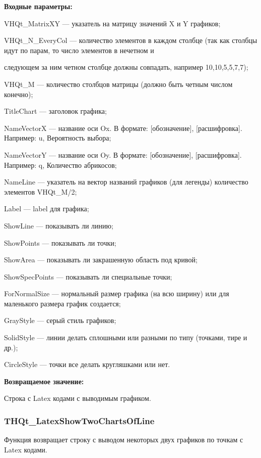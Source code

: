 \documentclass[a4paper,12pt]{article}
\begin{document}
\textbf{Входные параметры:}
 
VHQt\_MatrixXY --- указатель на матрицу значений X и Y графиков;
 
VHQt\_N\_EveryCol --- количество элементов в каждом столбце (так как столбцы идут по парам, то число элементов в нечетном и
 
следующем за ним четном столбце должны совпадать, например 10,10,5,5,7,7);
 
VHQt\_M --- количество столбцов матрицы (должно быть четным числом конечно);
 
TitleChart --- заголовок графика;
 
NameVectorX --- название оси Ox. В формате: [обозначение], [расшифровка]. Например: u, Вероятность выбора;
 
NameVectorY --- название оси Oy. В формате: [обозначение], [расшифровка]. Например: q, Количество абрикосов;
 
NameLine --- указатель на вектор названий графиков (для легенды) количество элементов VHQt\_M/2;
 
Label --- label для графика;
 
ShowLine --- показывать ли линию;
 
ShowPoints --- показывать ли точки;
 
ShowArea --- показывать ли закрашенную область под кривой;
 
ShowSpecPoints --- показывать ли специальные точки;
 
ForNormalSize --- нормальный размер графика (на всю ширину) или для маленького размера график создается;
 
GrayStyle --- серый стиль графиков;
 
SolidStyle --- линии делать сплошными или разными по типу (точками, тире и др.);
 
CircleStyle --- точки все делать кругляшками или нет.
	
\textbf{Возвращаемое значение:}

Строка с Latex кодами с выводимым графиком.


\subsubsection{THQt\_LatexShowTwoChartsOfLine}\label{THQt_LatexShowTwoChartsOfLine}

Функция возвращает строку с выводом некоторых двух графиков по точкам с Latex кодами.
\end{document}
